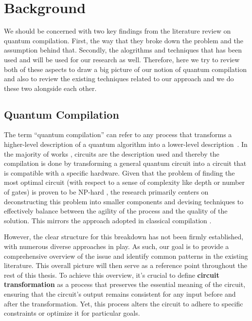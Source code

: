 \chapter{Background}\label{chap:background}

We should be concerned with two key findings from the literature review on quantum compilation. First, the way that they broke down the problem and the assumption behind that. Secondly, the alogrithms and techniques that has been used and will be used for our research as well. Therefore, here we try to review both of these aspects to draw a big picture of our notion of quantum compilation and also to review the existing techniques related to our approach and we do these two alongside each other.

\section{Quantum Compilation}
The term ``quantum compilation'' can refer to any process that transforms a higher-level description of a quantum algorithm into a lower-level description~\cite{hundt2022}. In the majority of works \cite{zulehner2018,childs,cross2022,sivarajah2021,qiskit2023,paler2021}, circuits are the description used and thereby the compilation is done by transforming a general quantum circuit into a circuit that is compatible with a specific hardware. Given that the problem of finding the most optimal circuit (with respect to a sense of complexity like depth or number of gates) is proven to be NP-hard \cite{siraichi2018}, the research primarily centers on deconstructing this problem into smaller components and devising techniques to effectively balance between the agility of the process and the quality of the solution. This mirrors the approach adopted in classical compilation \cite{allen2001}.

However, the clear structure for this breakdown has not been firmly established, with numerous diverse approaches in play. As such, our goal is to provide a comprehensive overview of the issue and identify common patterns in the existing literature. This overall picture will then serve as a reference point throughout the rest of this thesis. To achieve this overview, it's crucial to define \textbf{circuit transformation} as a process that preserves the essential meaning of the circuit, ensuring that the circuit's output remains consistent for any input before and after the transformation. Yet, this process alters the circuit to adhere to specific constraints or optimize it for particular goals.

